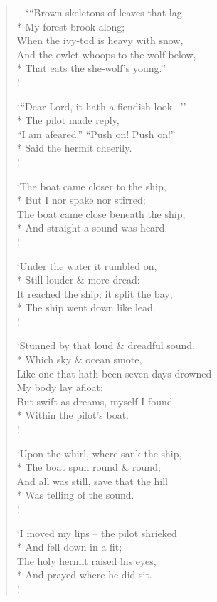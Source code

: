 \documentclass[MAIN]{subfiles}
\begin{document}
\begin{verse}[\versewidth]
`{``}Brown skeletons of leaves that lag\\*
\vin My forest-brook along;\\
When the ivy-tod is heavy with snow,\\
And the owlet whoops to the wolf below,\\*
\vin That eats the she-wolf's young.''\\!

`{``}Dear Lord, it hath a fiendish look --''\\*
\vin The pilot made reply,\\
``I am afeared.'' ``Push on! Push on!''\\*
\vin Said the hermit cheerily.\\!

`The boat came closer to the ship,\\*
\vin But I nor spake nor stirred;\\
The boat came close beneath the ship,\\*
\vin And straight a sound was heard.\\!

`Under the water it rumbled on,\\*
\vin Still louder \& more dread:\\
It reached the ship; it split the bay;\\*
\vin The ship went down like lead.\\!

`Stunned by that loud \& dreadful sound,\\*
\vin Which sky \& ocean smote,\\
Like one that hath been seven days drowned\\
\vin My body lay afloat;\\
But swift as dreams, myself I found\\*
\vin Within the pilot's boat.\\!

`Upon the whirl, where sank the ship,\\*
\vin The boat spun round \& round;\\
And all was still, save that the hill\\*
\vin Was telling of the sound.\\!

`I moved my lips -- the pilot shrieked\\*
\vin And fell down in a fit;\\
The holy hermit raised his eyes,\\*
\vin And prayed where he did sit.\\!


\end{verse}
\end{document}
